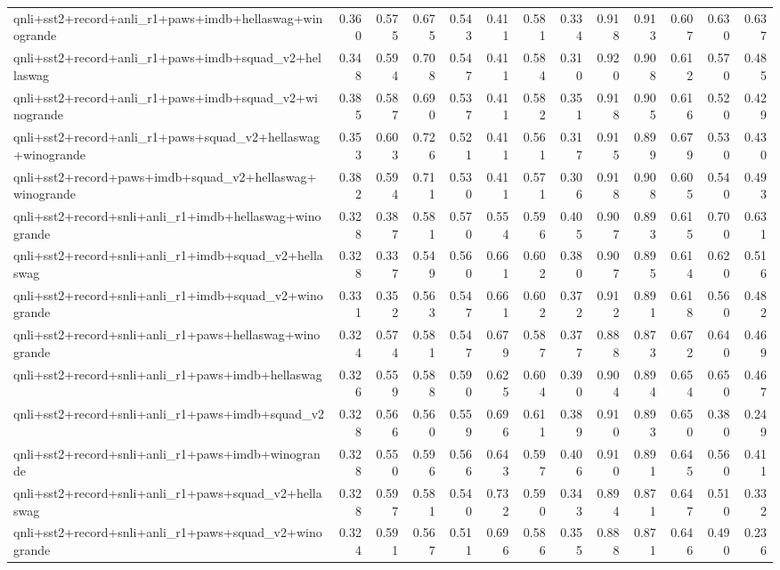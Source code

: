\begin{table}[t]
\begin{tabular}{lrrrrrrrrrrrr}
    qnli+sst2+record+anli\_r1+paws+imdb+hellaswag+winogrande & 0.360 & 0.575 & 0.675 & 0.543 & 0.411 & 0.581 & 0.334 & 0.918 & 0.913 & 0.607 & 0.630 & 0.637 \\
    qnli+sst2+record+anli\_r1+paws+imdb+squad\_v2+hellaswag & 0.348 & 0.594 & 0.708 & 0.547 & 0.411 & 0.584 & 0.310 & 0.920 & 0.908 & 0.612 & 0.570 & 0.485 \\
    qnli+sst2+record+anli\_r1+paws+imdb+squad\_v2+winogrande & 0.385 & 0.587 & 0.690 & 0.537 & 0.411 & 0.582 & 0.351 & 0.918 & 0.905 & 0.616 & 0.520 & 0.429 \\
    qnli+sst2+record+anli\_r1+paws+squad\_v2+hellaswag+winogrande & 0.353 & 0.603 & 0.726 & 0.521 & 0.411 & 0.561 & 0.317 & 0.915 & 0.899 & 0.679 & 0.530 & 0.430 \\
    qnli+sst2+record+paws+imdb+squad\_v2+hellaswag+winogrande & 0.382 & 0.594 & 0.711 & 0.530 & 0.411 & 0.571 & 0.306 & 0.918 & 0.908 & 0.605 & 0.540 & 0.493 \\
    qnli+sst2+record+snli+anli\_r1+imdb+hellaswag+winogrande & 0.328 & 0.387 & 0.581 & 0.570 & 0.554 & 0.596 & 0.405 & 0.907 & 0.893 & 0.615 & 0.700 & 0.631 \\
    qnli+sst2+record+snli+anli\_r1+imdb+squad\_v2+hellaswag & 0.328 & 0.337 & 0.549 & 0.560 & 0.661 & 0.602 & 0.380 & 0.907 & 0.895 & 0.614 & 0.620 & 0.516 \\
    qnli+sst2+record+snli+anli\_r1+imdb+squad\_v2+winogrande & 0.331 & 0.352 & 0.563 & 0.547 & 0.661 & 0.602 & 0.372 & 0.912 & 0.891 & 0.618 & 0.560 & 0.482 \\
    qnli+sst2+record+snli+anli\_r1+paws+hellaswag+winogrande & 0.324 & 0.574 & 0.581 & 0.547 & 0.679 & 0.587 & 0.377 & 0.888 & 0.873 & 0.672 & 0.640 & 0.469 \\
    qnli+sst2+record+snli+anli\_r1+paws+imdb+hellaswag & 0.326 & 0.559 & 0.588 & 0.590 & 0.625 & 0.604 & 0.390 & 0.904 & 0.894 & 0.654 & 0.650 & 0.467 \\
    qnli+sst2+record+snli+anli\_r1+paws+imdb+squad\_v2 & 0.328 & 0.566 & 0.560 & 0.559 & 0.696 & 0.611 & 0.389 & 0.910 & 0.893 & 0.650 & 0.380 & 0.249 \\
    qnli+sst2+record+snli+anli\_r1+paws+imdb+winogrande & 0.328 & 0.550 & 0.596 & 0.566 & 0.643 & 0.597 & 0.406 & 0.910 & 0.891 & 0.645 & 0.560 & 0.411 \\
    qnli+sst2+record+snli+anli\_r1+paws+squad\_v2+hellaswag & 0.328 & 0.597 & 0.581 & 0.540 & 0.732 & 0.590 & 0.343 & 0.894 & 0.871 & 0.647 & 0.510 & 0.332 \\
    qnli+sst2+record+snli+anli\_r1+paws+squad\_v2+winogrande & 0.324 & 0.591 & 0.567 & 0.511 & 0.696 & 0.586 & 0.355 & 0.888 & 0.871 & 0.646 & 0.490 & 0.236 \\

\end{tabular}
\end{table}
